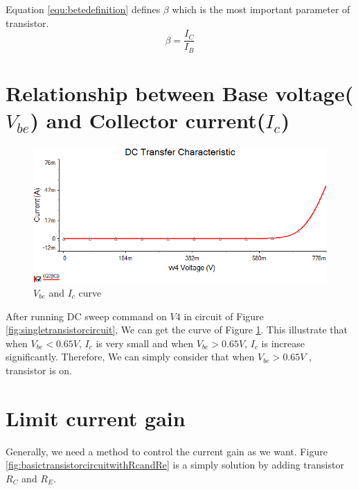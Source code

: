  Equation \ref{equ:betedefinition} defines $\beta$ which is the most important parameter of transistor.  
\begin{equation}
\beta = \frac{I_C}{I_B}
\label{equ:betedefinition}
\end{equation}

\section{Relationship between Base voltage($ V_{be} $) and Collector current($ I_c $)}

\begin{figure}[htbp]
  \centering
  \includegraphics[scale=0.7]{"../Photo/Chap1/Vbe and Ic curve"}
  \caption{$ V_{be} $ and $ I_c $ curve}
  \label{fig:VbeandIccurve}
\end{figure}

After running DC sweep command on $ V4 $ in circuit of Figure \ref{fig:singletransistorcircuit}, We can get the curve of Figure \ref{fig:VbeandIccurve}. This illustrate that when $ V_{be} < 0.65V $, $ I_c $ is very small and when $ V_{be} > 0.65V $, $ I_c $ is increase significantly. Therefore, We can simply consider that when $ V_{be} > 0.65V$ , transistor is on.


\section{Limit current gain} 
Generally, we need a method to control the current gain as we want. Figure \ref{fig:basictransistorcircuitwithRcandRe} is a simply solution by adding transistor $R_C$ and $R_E$.

